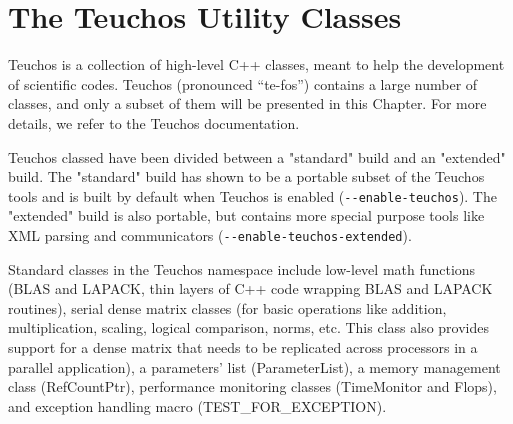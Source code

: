 % 
% 
% 
%   
%   
% 
% 

\section{The Teuchos Utility Classes}
\label{chap:teuchos}

Teuchos is a collection of high-level C++ classes, meant to 
help the development of scientific codes. Teuchos (pronounced
``te-fos'') contains a large number of classes, and only a subset of
them will be presented in this Chapter. For more details, we refer to
the Teuchos documentation.

Teuchos classed have been divided between a "standard" build and an
"extended" build. The "standard" build has shown to be a portable subset
of the Teuchos tools and is built by default when Teuchos is enabled
(\verb!--enable-teuchos!). The "extended" build is also portable, but
contains more special purpose tools like XML parsing and communicators
(\verb!--enable-teuchos-extended!).

Standard classes in the Teuchos namespace include low-level math
functions (BLAS and LAPACK, thin layers of C++ code wrapping BLAS and
LAPACK routines), serial dense matrix classes (for basic operations like
addition, multiplication, scaling, logical comparison, norms, etc. This
class also provides support for a dense matrix that needs to be
replicated across processors in a parallel application), a parameters'
list (ParameterList), a memory management class (RefCountPtr),
performance monitoring classes (TimeMonitor and Flops),
and exception handling macro (TEST\_FOR\_EXCEPTION).

